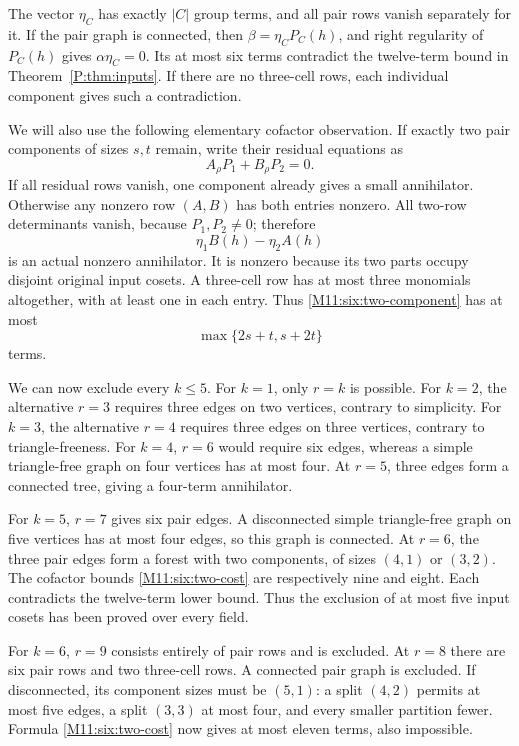 \documentclass[11pt,a4paper,oneside]{report}
\theoremstyle{definition}
\theoremstyle{remark}
\begin{document}
The vector \(\eta_C\) has exactly \(|C|\) group terms, and all pair rows
vanish separately for it. If the pair graph is connected, then
\(\beta=\eta_CP_C(h)\), and right regularity of \(P_C(h)\) gives
\(\alpha\eta_C=0\). Its at most six terms contradict the twelve-term
bound in Theorem~\ref{P:thm:inputs}. If there are no three-cell rows, each
individual component gives such a contradiction.

We will also use the following elementary cofactor observation. If
exactly two pair components of sizes \(s,t\) remain, write their residual
equations as
\[
 A_\rho P_1+B_\rho P_2=0.
\]
If all residual rows vanish, one component already gives a small
annihilator. Otherwise any nonzero row \((A,B)\) has both entries
nonzero. All two-row determinants vanish, because \(P_1,P_2\ne0\);
therefore
\begin{equation}\label{M11:six:two-component}
 \eta_1B(h)-\eta_2A(h)
\end{equation}
is an actual nonzero annihilator. It is nonzero because its two parts
occupy disjoint original input cosets. A three-cell row has at most
three monomials altogether, with at least one in each entry. Thus
\eqref{M11:six:two-component} has at most
\begin{equation}\label{M11:six:two-cost}
 \max\{2s+t,s+2t\}
\end{equation}
terms.

We can now exclude every \(k\le5\). For \(k=1\), only \(r=k\) is possible.
For \(k=2\), the alternative \(r=3\) requires three edges on two
vertices, contrary to simplicity. For \(k=3\), the alternative \(r=4\)
requires three edges on three vertices, contrary to triangle-freeness.
For \(k=4\), \(r=6\) would require six edges, whereas a simple
triangle-free graph on four vertices has at most four. At \(r=5\),
three edges form a connected tree, giving a four-term annihilator.

For \(k=5\), \(r=7\) gives six pair edges. A disconnected simple
triangle-free graph on five vertices has at most four edges, so this
graph is connected. At \(r=6\), the three pair edges form a forest with
two components, of sizes \((4,1)\) or \((3,2)\). The cofactor bounds
\eqref{M11:six:two-cost} are respectively nine and eight. Each contradicts
the twelve-term lower bound. Thus the exclusion of at most five input
cosets has been proved over every field.

For \(k=6\), \(r=9\) consists entirely of pair rows and is excluded.
At \(r=8\) there are six pair rows and two three-cell rows. A connected
pair graph is excluded. If disconnected, its component sizes must be
\((5,1)\): a split \((4,2)\) permits at most five edges, a split
\((3,3)\) at most four, and every smaller partition fewer. Formula
\eqref{M11:six:two-cost} now gives at most eleven terms, also impossible.
\end{document}

